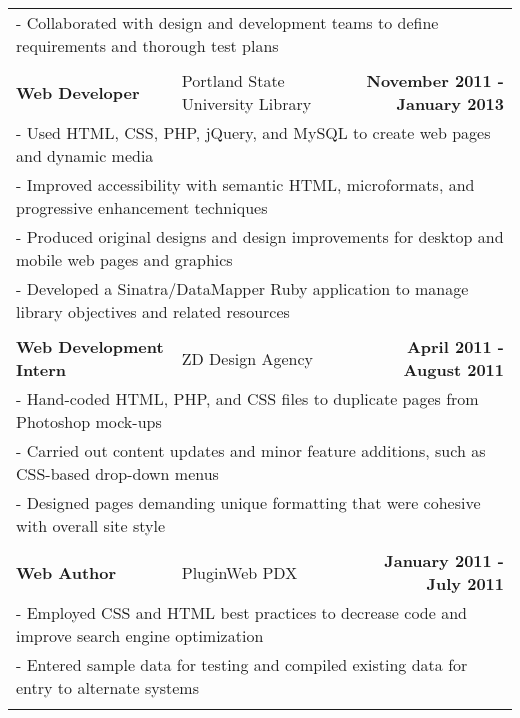 \documentclass[letterpaper]{article}
\begin{document}
\begin{center}
\begin{tabular}{p{}p{}r}
			\\
				\multicolumn{3}{p{\textwidth}}{\quad\quad - Collaborated with design and development teams to define requirements and thorough test plans}
			\\
			\\
				\textbf{Web Developer}						&
				Portland State University Library					&
				\textbf{November 2011 - January 2013}
			\\
				\multicolumn{3}{p{\textwidth}}{\quad\quad - Used HTML, CSS, PHP, jQuery, and MySQL to create web pages and dynamic media} 
			\\
				\multicolumn{3}{p{\textwidth}}{\quad\quad - Improved accessibility with semantic HTML, microformats, and progressive enhancement techniques} 
			\\
				\multicolumn{3}{p{\textwidth}}{\quad\quad - Produced original designs and design improvements for desktop and mobile web pages and graphics} 
			\\
				\multicolumn{3}{p{\textwidth}}{\quad\quad - Developed a Sinatra/DataMapper Ruby application to manage library objectives and related resources} 
			\\
			\\
				\textbf{Web Development Intern}						&
				ZD Design Agency									&
				\textbf{April 2011 - August 2011}
			\\
				\multicolumn{3}{p{\textwidth}}{\quad\quad - Hand-coded HTML, PHP, and CSS files to duplicate pages from Photoshop mock-ups} 
			\\
				\multicolumn{3}{p{\textwidth}}{\quad\quad - Carried out content updates and minor feature additions, such as CSS-based drop-down menus} 
			\\
				\multicolumn{3}{p{\textwidth}}{\quad\quad - Designed pages demanding unique formatting that were cohesive with overall site style} 
			\\
			\\
				\textbf{Web Author}									&
				PluginWeb PDX										&
				\textbf{January 2011 - July 2011}
			\\
				\multicolumn{3}{p{\textwidth}}{\quad\quad - Employed CSS and HTML best practices to decrease code and improve search engine optimization} 
			\\
				\multicolumn{3}{p{\textwidth}}{\quad\quad - Entered sample data for testing and compiled existing data for entry to alternate systems} 
			\\
			\\

\end{tabular}
\end{center}
\end{document}
